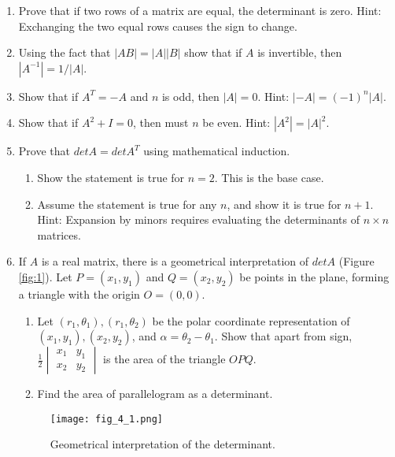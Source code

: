 \documentclass[../main.tex]{subfiles}
\begin{document}
\begin{enumerate}[label=\textbf{\thechapter.\arabic{*}}]
  \item \label{pr:4_15} Prove that if two rows of a matrix  are equal, the determinant is zero. Hint: Exchanging the two equal rows causes the sign to change.
  \item \label{pr:4_16} Using the fact that \(|AB| = |A||B|\) show that if \(A\) is invertible, then \(|A^{-1}| = 1/|A|\).
  \item \label{pr:4_17} Show that if \(A^{T} = -A\) and \(n\) is odd, then \(|A| = 0\). Hint: \(|-A| = (-1)^n|A|\).
  \item \label{pr:4_18} Show that if \(A^2 + I = 0\), then must \(n\) be even. Hint: \(|A^2| = |A|^2\).
  \item \label{pr:4_19} Prove that \(det A = det A^T\) using mathematical induction.
  \begin{enumerate}[leftmargin=*, label=\textbf{\alph{*}.}]
    \item Show the statement is true for \(n = 2\). This is the base case.
    \item Assume the statement is true for any \(n\), and show it is true for \(n + 1\). Hint: Expansion by minors requires evaluating the determinants of \(n \times n\) matrices.
  \end{enumerate}
  
  \item \label{pr:4_20} If \(A\) is a real matrix, there is a geometrical interpretation of \(detA\) (Figure \ref{fig:1}). Let \(P = (x_1,y_1)\) and \(Q = (x_2, y_2)\) be points in the plane, forming a triangle with the origin \(O = (0,0)\).
  \begin{enumerate}[leftmargin=*, label=\textbf{\arabic{*}.}]
    \item Let \((r_1, \theta_1), (r_1, \theta_2)\) be the polar coordinate representation of \((x_1, y_1), (x_2, y_2)\), and \(\alpha = \theta_2 - \theta_1\). Show that apart from sign, \(\frac{1}{2}\begin{vmatrix}
      x_1 & y_1\\
      x_2 & y_2
    \end{vmatrix}\)
    is the area of the triangle \(OPQ\).
    
    \item Find the area of parallelogram as a determinant.
  \end{enumerate}
  \begin{figure}[h]
    \centerline{\texttt{[image: fig\_4\_1.png]}}
    \caption{Geometrical interpretation of the determinant.}
    \label{fig:4_1}
  \end{figure}
\end{enumerate}
\end{document}

